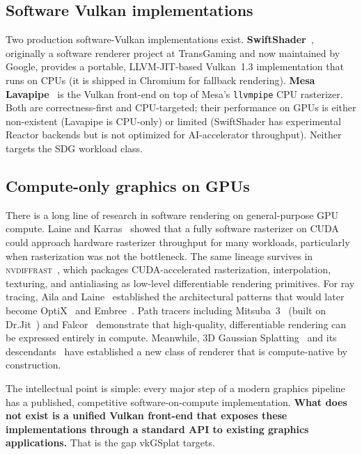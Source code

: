 \documentclass[10pt,journal,onecolumn]{IEEEtran}
\begin{document}
\subsection{Software Vulkan implementations}

Two production software-Vulkan implementations exist.
\textbf{SwiftShader}~\cite{swiftshader}, originally a software renderer
project at TransGaming and now maintained by Google, provides a portable,
LLVM-JIT-based Vulkan~1.3 implementation that runs on CPUs (it is shipped
in Chromium for fallback rendering). \textbf{Mesa Lavapipe}~\cite{mesa-lavapipe}
is the Vulkan front-end on top of Mesa's \texttt{llvmpipe} CPU rasterizer.
Both are correctness-first and CPU-targeted; their performance on GPUs is
either non-existent (Lavapipe is CPU-only) or limited (SwiftShader has
experimental Reactor backends but is not optimized for AI-accelerator
throughput). Neither targets the SDG workload class.

\subsection{Compute-only graphics on GPUs}

There is a long line of research in software rendering on
general-purpose GPU compute. Laine and
Karras~\cite{laine2011software} showed that a fully software rasterizer
on CUDA could approach hardware rasterizer throughput for many workloads,
particularly when rasterization was not the bottleneck.  The same
lineage survives in \textsc{nvdiffrast}~\cite{laine2020nvdiffrast}, which
packages CUDA-accelerated rasterization, interpolation, texturing, and
antialiasing as low-level differentiable rendering primitives.
For ray tracing, Aila and Laine~\cite{aila2009understanding} established
the architectural patterns that would later become OptiX~\cite{parker2010optix}
and Embree~\cite{wald2014embree}. Path tracers including
Mitsuba~3~\cite{jakob2022mitsuba3} (built on Dr.Jit~\cite{jakob2022drjit})
and Falcor~\cite{benty2020falcor} demonstrate that high-quality,
differentiable rendering can be expressed entirely in compute.
Meanwhile, 3D Gaussian Splatting~\cite{kerbl20233dgs} and its
descendants~\cite{yu2024mip,huang20242dgs,ye2024gsplat} have established a new class
of renderer that is compute-native by construction.

The intellectual point is simple: every major step of a modern graphics
pipeline has a published, competitive software-on-compute implementation.
\textbf{What does not exist is a unified Vulkan front-end that exposes
these implementations through a standard API to existing graphics
applications.} That is the gap vkGSplat targets.
\end{document}

